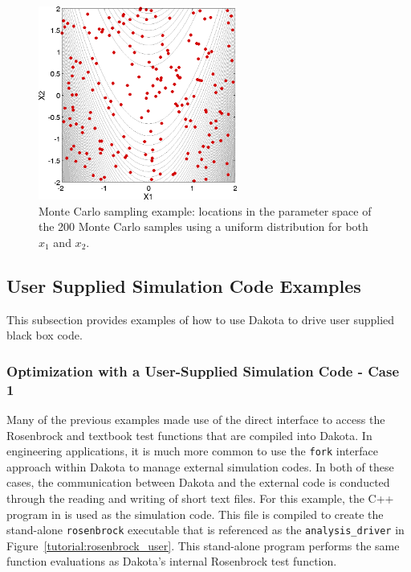 \begin{figure}[ht!]
  \centering
  \includegraphics[height=2.5in]{images/rosen_nond_pts}
  \caption{Monte Carlo sampling example: locations in the parameter
    space of the 200 Monte Carlo samples using a uniform distribution
    for both $x_1$ and $x_2$.}
  \label{tutorial:rosenbrock_mc_points}
\end{figure}

\subsection{User Supplied Simulation Code Examples}\label{tutorial:examples:user_supply}
This subsection provides examples of how to use Dakota to drive user 
supplied black box code.

\subsubsection{Optimization with a User-Supplied Simulation Code - Case 1}\label{tutorial:examples:user_supply:optimization1}

Many of the previous examples made use of the direct interface to
access the Rosenbrock and textbook test functions that are compiled
into Dakota. In engineering applications, it is much more common to
use the \texttt{fork} interface approach within
Dakota to manage external simulation codes. In both of these cases,
the communication between Dakota and the external code is conducted
through the reading and writing of short text files. For this example,
the C++ program  in  is used
as the simulation code. This file is compiled to create the
stand-alone \texttt{rosenbrock} executable that is referenced as the
\texttt{analysis\_driver} in Figure~\ref{tutorial:rosenbrock_user}.
This stand-alone program performs the same function evaluations as
Dakota's internal Rosenbrock test function.

